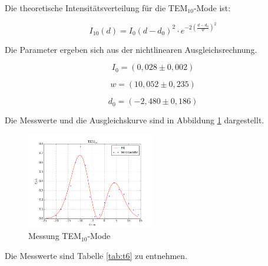 \noindent Die theoretische Intensitätsverteilung für die TEM\(_{10}\)-Mode ist:

\begin{equation}
I_{10}(d)=I_0(d-d_0)^2\cdot e^{-2\left(\frac{d-d_0}{w}\right)^2}
\end{equation}

\noindent Die Parameter ergeben sich aus der nichtlinearen Ausgleichsrechnung.

\begin{equation*}
I_0=(0,028\pm0,002)
\end{equation*}

\begin{equation*}
w=(10,052\pm0,235)
\end{equation*}

\begin{equation*}
d_0=(-2,480\pm0,186)
\end{equation*}

\noindent Die Messwerte und die Ausgleichskurve sind in Abbildung \ref{fig:TEM10} dargestellt. 

\begin{figure}[H]
	\centering
	\includegraphics[width=0.5\textwidth]{plots/TEM10}
	\caption{Messung TEM\(_{10}\)-Mode}
	\label{fig:TEM10}
\end{figure}

\noindent Die Messwerte sind Tabelle \ref{tab:t6} zu entnehmen.

